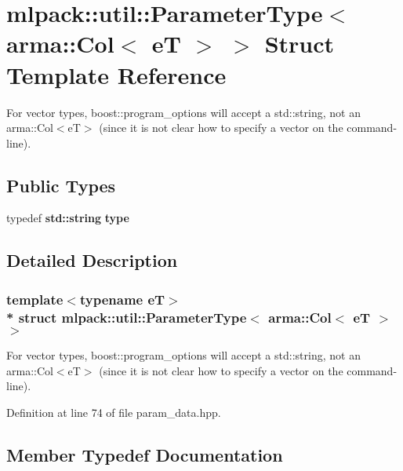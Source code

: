 \section{mlpack\+:\+:util\+:\+:Parameter\+Type$<$ arma\+:\+:Col$<$ eT $>$ $>$ Struct Template Reference}
\label{structmlpack_1_1util_1_1ParameterType_3_01arma_1_1Col_3_01eT_01_4_01_4}


For vector types, boost\+::program\+\_\+options will accept a std\+::string, not an arma\+::\+Col$<$e\+T$>$ (since it is not clear how to specify a vector on the command-\/line).  


\subsection*{Public Types}
\begin{DoxyCompactItemize}
\item 
typedef {\bf std\+::string} {\bf type}
\end{DoxyCompactItemize}


\subsection{Detailed Description}
\subsubsection*{template$<$typename eT$>$\\*
struct mlpack\+::util\+::\+Parameter\+Type$<$ arma\+::\+Col$<$ e\+T $>$ $>$}

For vector types, boost\+::program\+\_\+options will accept a std\+::string, not an arma\+::\+Col$<$e\+T$>$ (since it is not clear how to specify a vector on the command-\/line). 

Definition at line 74 of file param\+\_\+data.\+hpp.



\subsection{Member Typedef Documentation}

